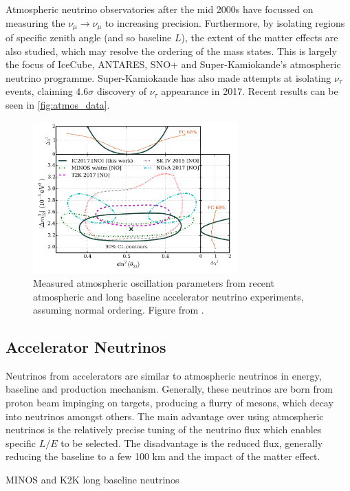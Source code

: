 Atmospheric neutrino observatories after the mid 2000s have focussed on measuring the $\nu_\mu\rightarrow\nu_\mu$ to increasing precision. Furthermore, by isolating regions of specific zenith angle (and so baseline $L$), the extent of the matter effects are also studied, which may resolve the ordering of the mass states. This is largely the focus of IceCube\cite{icecube}, ANTARES\cite{antares}, SNO+ and Super-Kamiokande's atmospheric neutrino programme. Super-Kamiokande has also made attempts at isolating $\nu_\tau$ events\cite{superk_tau}, claiming $4.6\sigma$ discovery of $\nu_\tau$ appearance in 2017. Recent results can be seen in \autoref{fig:atmos_data}.
\begin{figure}[h]
	\includegraphics[width=0.7\textwidth, trim={0mm 0mm 0mm 0mm}, clip,page=1]{figures/theory/icecube_comp}
	\caption{Measured atmospheric oscillation parameters from recent atmospheric and long baseline accelerator neutrino experiments, assuming normal ordering. Figure from \cite{icecube}.}
	\label{fig:atmos_data}
\end{figure}

\subsection{Accelerator Neutrinos}
Neutrinos from accelerators are similar to atmospheric neutrinos in energy, baseline and production mechanism. Generally, these neutrinos are born from proton beam impinging on targets, producing a flurry of mesons, which decay into neutrinos amongst others. The main advantage over using atmospheric neutrinos is the relatively precise tuning of the neutrino flux which enables specific $L/E$ to be selected. The disadvantage is the reduced flux, generally reducing the baseline to a few 100 km and the impact of the matter effect.

MINOS and K2K long baseline neutrinos

